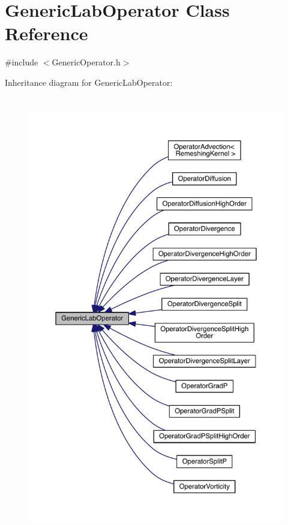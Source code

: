 \hypertarget{class_generic_lab_operator}{}\section{Generic\+Lab\+Operator Class Reference}
\label{class_generic_lab_operator}


{\ttfamily \#include $<$Generic\+Operator.\+h$>$}



Inheritance diagram for Generic\+Lab\+Operator\+:
\nopagebreak
\begin{figure}[H]
\begin{center}
\leavevmode
\includegraphics[height=550pt]{df/d01/class_generic_lab_operator__inherit__graph}
\end{center}
\end{figure}
